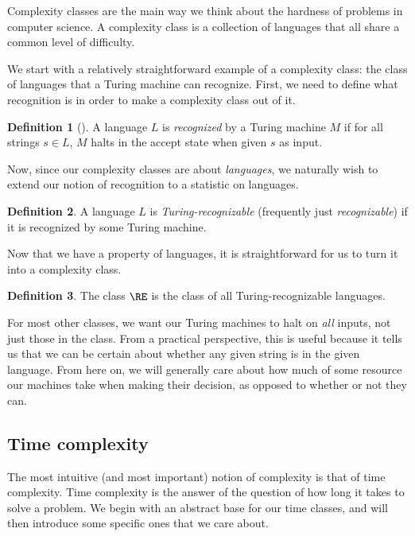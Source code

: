 \documentclass[english,12pt]{reedthesis}
\theoremstyle{plain}
\theoremstyle{definition}
\newtheorem{defn}[defn]{Definition}
\theoremstyle{remark}
\begin{document}
Complexity classes are the main way we think about the hardness of problems in
computer science. A complexity class is a collection of
languages that all share a common level of difficulty.

We start with a relatively straightforward example of a complexity class: the
class of languages that a Turing machine can recognize. First, we need to
define what recognition is in order to make a complexity class out of it.

\begin{defn}[{\cite[Def.\ 3.2]{Sip97}}]\label{def:recognition}
  A language $L$ is \emph{recognized} by a Turing machine $M$ if for all strings
  $s \in L$, $M$ halts in the accept state when given $s$ as input.
\end{defn}

Now, since our complexity classes are about \emph{languages}, we naturally wish
to extend our notion of recognition to a statistic on languages.

\begin{defn}\label{def:turing-recognizable}
  A language $L$ is \emph{Turing-recognizable} (frequently just
  \emph{recognizable}) if it is recognized by some Turing machine.
\end{defn}

Now that we have a property of languages, it is straightforward for us to turn
it into a complexity class.

\begin{defn}\label{def:re}
  The class $\RE$ is the class of all Turing-recognizable languages.
\end{defn}

For most other classes, we want our Turing machines to halt on \emph{all}
inputs, not just those in the class. From a practical perspective, this is
useful because it tells us that we can be certain about whether any given string
is in the given language. From here on, we will generally care about how much of
some resource our machines take when making their decision, as opposed to
whether or not they can.

\subsection{Time complexity}

The most intuitive (and most important) notion of complexity is that of time
complexity. Time complexity is the answer of the question of how long it takes
to solve a problem. We begin with an abstract base for our time classes, and
will then introduce some specific ones that we care about.
\end{document}
